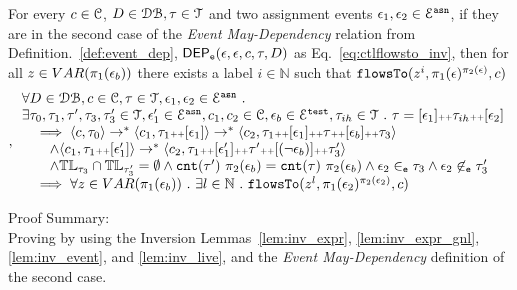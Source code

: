 %
\begin{lem}
	\label{lem:ctldep_inv}
	For every $c \in \mathcal{C}$, $D \in \mathcal{DB}, \mathtt{\tau} \in \mathcal{T}$ and two assignment events $\mathtt{\epsilon}_1, \mathtt{\epsilon}_2 \in \mathcal{E}^{\mathtt{{asn}}} $, if they are in the second case of the \emph{Event May-Dependency} relation from Definition.~\ref{def:event_dep},
	$\mathsf{DEP_{\mathtt{e}}}(\mathtt{\epsilon}, \mathtt{\epsilon}, c, \mathtt{\tau}, D)$ as Eq.~\ref{eq:ctlflowsto_inv},
	then for all  $z \in VAR(\pi_1(\mathtt{\epsilon}_b))$ there exists a label $i \in \mathbb{N}$ such that 
	$\mathtt{flowsTo}(z^i, \pi_1(\mathtt{\epsilon})^{\pi_2(\mathtt{\epsilon})}, c)$
	\begin{equation}
		\label{eq:ctlflowsto_inv},		
		\begin{array}{l}
			\forall D \in \mathcal{DB} , c \in \mathcal{C}, \mathtt{\tau} \in \mathcal{T},
			\mathtt{\epsilon}_1, \mathtt{\epsilon}_2 \in \mathcal{E}^{\mathtt{{asn}}} ~.~ 
			\\ 
			\exists \mathtt{\tau}_0,
			\mathtt{\tau}_1, \mathtt{\tau}', \mathtt{\tau}_3, \mathtt{\tau}_3' \in \mathcal{T},\mathtt{\epsilon}_1' \in \mathcal{E}^{\mathtt{{asn}}}, {c}_1, {c}_2  \in \mathcal{C}, 
			\mathtt{\epsilon}_b \in \mathcal{E}^{\mathtt{{test}}},
			\mathtt{\tau}_{ih} \in \mathcal{T} ~.~ 
		\mathtt{\tau} = [\mathtt{\epsilon}_1] {\scriptscriptstyle ++} \mathtt{\tau}_{ih} {\scriptscriptstyle ++} [\mathtt{\epsilon}_2]
		\\ \quad \implies	  
			  \langle {c}, \mathtt{\tau}_0 \rangle \rightarrow^{*} 
				\langle {c}_1, \mathtt{\tau}_1 {\scriptscriptstyle ++} [\mathtt{\epsilon}_1] \rangle  \rightarrow^{*} 
				\langle c_2,  \mathtt{\tau}_1 {\scriptscriptstyle ++} [\mathtt{\epsilon}_1] {\scriptscriptstyle ++} \mathtt{\tau} {\scriptscriptstyle ++} [\mathtt{\epsilon}_b] {\scriptscriptstyle ++}  \mathtt{\tau}_3 \rangle 
			  \\ \qquad \land
			  \langle {c}_1, \mathtt{\tau}_1 {\scriptscriptstyle ++} [\mathtt{\epsilon}_1'] \rangle  \rightarrow^{*} 
			  \langle c_2,  \mathtt{\tau}_1 {\scriptscriptstyle ++} [\mathtt{\epsilon}_1'] {\scriptscriptstyle ++} \mathtt{\tau}' {\scriptscriptstyle ++} [(\neg \mathtt{\epsilon}_b)] {\scriptscriptstyle ++} \mathtt{\tau}_3' \rangle 
			  \\ \qquad \land
			\mathbb{TL}_{\mathtt{\tau}_3} \cap \mathbb{TL}_{\mathtt{\tau}_3'} = \emptyset
			   \land \mathtt{cnt}(\mathtt{\tau}') ~  \pi_2(\mathtt{\epsilon}_b) = \mathtt{cnt}(\mathtt{\tau}) ~  \pi_2(\mathtt{\epsilon}_b)
				\land \mathtt{\epsilon}_2 \in_{\mathtt{e}} \mathtt{\tau}_3
			  \land \mathtt{\epsilon}_2 \not\in_{\mathtt{e}} \mathtt{\tau}_3'
		\\ \quad \implies	
		\forall z \in VAR(\pi_1(\mathtt{\epsilon}_b)) ~.~ 
		\exists l \in \mathbb{N} ~.~ 
		\mathtt{flowsTo}(z^l, \pi_1(\mathtt{\epsilon}_2)^{\pi_2(\mathtt{\epsilon}_2)},c)
	\end{array}
\end{equation}
	\end{lem}
	Proof Summary:
	\\
	Proving by using the Inversion Lemmas~\ref{lem:inv_expr}, \ref{lem:inv_expr_gnl}, 
	\ref{lem:inv_event}, and \ref{lem:inv_live}, and the \emph{Event May-Dependency} definition of the second case.
%
